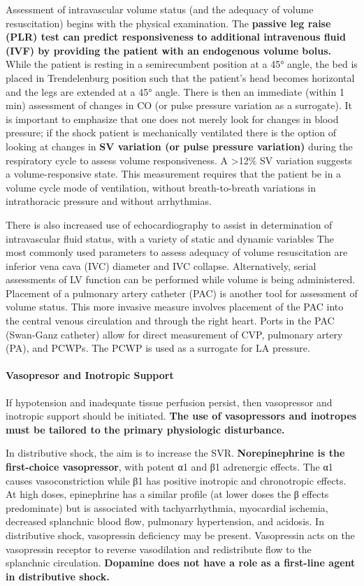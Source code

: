 \documentclass[
  letterpaper,
  DIV=11,
  numbers=noendperiod]{scrreprt}
\let\oldparagraph\paragraph
\renewcommand{\paragraph}[1]{\oldparagraph{#1}\mbox{}}
\begin{document}
Assessment of intravascular volume status (and the adequacy of volume
resuscitation) begins with the physical examination. The \textbf{passive
leg raise (PLR) test can predict responsiveness to additional
intravenous fluid (IVF) by providing the patient with an endogenous
volume bolus.} While the patient is resting in a semirecumbent position
at a 45° angle, the bed is placed in Trendelenburg position such that
the patient's head becomes horizontal and the legs are extended at a 45°
angle. There is then an immediate (within 1 min) assessment of changes
in CO (or pulse pressure variation as a surrogate). It is important to
emphasize that one does not merely look for changes in blood pressure;
if the shock patient is mechanically ventilated there is the option of
looking at changes in \textbf{SV variation (or pulse pressure
variation)} during the respiratory cycle to assess volume
responsiveness. A \textgreater12\% SV variation suggests a
volume-responsive state. This measurement requires that the patient be
in a volume cycle mode of ventilation, without breath-to-breath
variations in intrathoracic pressure and without arrhythmias.

There is also increased use of echocardiography to assist in
determination of intravascular fluid status, with a variety of static
and dynamic variables The most commonly used parameters to assess
adequacy of volume resuscitation are inferior vena cava (IVC) diameter
and IVC collapse. Alternatively, serial assessments of LV function can
be performed while volume is being administered. Placement of a
pulmonary artery catheter (PAC) is another tool for assessment of volume
status. This more invasive measure involves placement of the PAC into
the central venous circulation and through the right heart. Ports in the
PAC (Swan-Ganz catheter) allow for direct measurement of CVP, pulmonary
artery (PA), and PCWPs. The PCWP is used as a surrogate for LA pressure.

\paragraph{Vasopresor and Inotropic
Support}\label{vasopresor-and-inotropic-support}

If hypotension and inadequate tissue perfusion persist, then vasopressor
and inotropic support should be initiated. \textbf{The use of
vasopressors and inotropes must be tailored to the primary physiologic
disturbance.}

In distributive shock, the aim is to increase the SVR.
\textbf{Norepinephrine is the first-choice vasopressor}, with potent α1
and β1 adrenergic effects. The α1 causes vasoconstriction while β1 has
positive inotropic and chronotropic effects. At high doses, epinephrine
has a similar profile (at lower doses the β effects predominate) but is
associated with tachyarrhythmia, myocardial ischemia, decreased
splanchnic blood flow, pulmonary hypertension, and acidosis. In
distributive shock, vasopressin deficiency may be present. Vasopressin
acts on the vasopressin receptor to reverse vasodilation and
redistribute flow to the splanchnic circulation. \textbf{Dopamine does
not have a role as a first-line agent in distributive shock.}
\end{document}
